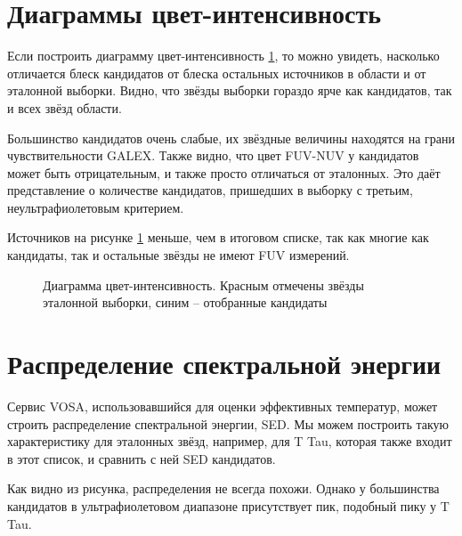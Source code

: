 

\section{Диаграммы цвет-интенсивность}

Если построить диаграмму цвет-интенсивность \ref{fig:color-magnitude}, то можно увидеть, насколько отличается блеск кандидатов от блеска остальных источников в области и от эталонной выборки. Видно, что звёзды выборки гораздо ярче как кандидатов, так и всех звёзд области. 

Большинство кандидатов очень слабые, их звёздные величины находятся на грани чувствительности GALEX. Также видно, что цвет FUV-NUV у кандидатов может быть отрицательным, и также просто отличаться от эталонных. Это даёт представление о количестве кандидатов, пришедших в выборку с третьим, неультрафиолетовым критерием.

Источников на рисунке \ref{fig:color-magnitude} меньше, чем в итоговом списке, так как многие как кандидаты, так и остальные звёзды не имеют FUV измерений.

\begin{figure}[ht]
\hfill
\caption{Диаграмма цвет-интенсивность. Красным отмечены звёзды эталонной выборки, синим -- отобранные кандидаты}
\label{fig:color-magnitude}
\end{figure}

\section{Распределение спектральной энергии}

Сервис VOSA, использовавшийся для оценки эффективных температур, может строить распределение спектральной энергии, SED. Мы можем построить такую характеристику для эталонных звёзд, например, для T Tau, которая также входит в этот список, и сравнить с ней SED кандидатов. 

Как видно из рисунка, распределения не всегда похожи. Однако у большинства кандидатов в ультрафиолетовом диапазоне присутствует пик, подобный пику у T Tau.

